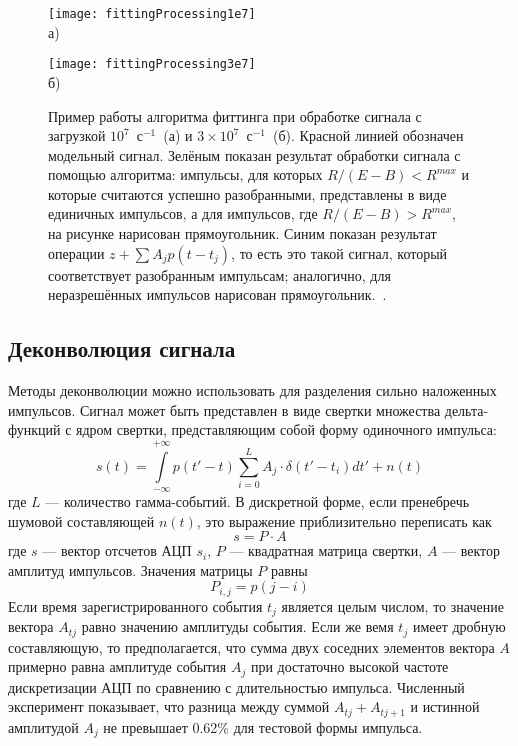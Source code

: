 \begin{figure}[ht]
    \begin{minipage}[b][][b]{0.95\linewidth}\centering
        \texttt{[image: fittingProcessing1e7]} \\ а)
    \end{minipage}
    \vfill
    \begin{minipage}[b][][b]{0.95\linewidth}\centering
        \texttt{[image: fittingProcessing3e7]} \\ б)
    \end{minipage}
    \vspace{5mm}
    \caption{ Пример работы алгоритма фиттинга при обработке сигнала с загрузкой $10^7$~с${}^{-1}$~(а) и $3 \times 10^7$~с${}^{-1}$~(б). Красной линией обозначен модельный сигнал. Зелёным показан результат обработки сигнала с помощью алгоритма: импульсы, для которых $R/(E-B)<R^{max}$ и которые считаются успешно разобранными, представлены в виде единичных импульсов, а для импульсов, где $R/(E-B)>R^{max}$, на рисунке нарисован прямоугольник. Синим показан результат операции $z + \sum A_j p(t - t_j)$, то есть это такой сигнал, который соответствует разобранным импульсам; аналогично, для неразрешённых импульсов нарисован прямоугольник.~\cite{Khilkevitch2020}. }
    \label{fig:FittingProcessing}
\end{figure}


\subsection{Деконволюция сигнала}

Методы деконволюции можно использовать для разделения сильно наложенных импульсов. Сигнал может быть представлен в виде свертки множества дельта-функций с ядром свертки, представляющим собой форму одиночного импульса: 
\begin{equation}
  \label{eq:SignalAsConvolution}
  s(t) = \int \limits_{-\infty}^{+\infty} p( t' - t ) \sum \limits_{i=0}^{L} A_j \cdot \delta(t' - t_i) dt' + n(t)
\end{equation}
где $L$ --- количество гамма-событий. В дискретной форме, если пренебречь шумовой составляющей $n(t)$, это выражение приблизительно переписать как 
\begin{equation}
  s = P \cdot A
\end{equation}
где $s$ --- вектор отсчетов АЦП $s_i$, $P$ --- квадратная матрица свертки, $A$ --- вектор амплитуд импульсов. Значения матрицы $P$ равны
\begin{equation*}
  P_{i,j} = p( j - i )
\end{equation*}
Если время зарегистрированного события $t_j$ является целым числом, то значение вектора $A_{tj}$ равно значению амплитуды события. Если же вемя $t_j$ имеет дробную составляющую, то предполагается, что сумма двух соседних элементов вектора $A$ примерно равна амплитуде события $A_j$ при достаточно высокой частоте дискретизации АЦП по сравнению с длительностью импульса. Численный эксперимент показывает, что разница между суммой $A_{tj} + A_{tj+1}$ и истинной амплитудой $A_j$ не превышает 0.62\% для тестовой формы импульса.

